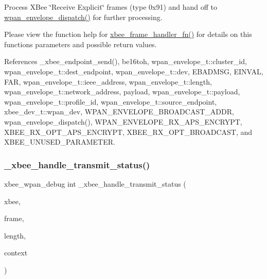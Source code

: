 Process X\+Bee \char`\"{}\+Receive Explicit\char`\"{} frames (type 0x91) and hand off to \hyperlink{group__wpan__aps_gae84eafd10f51de6cdac4732b8948606d}{wpan\+\_\+envelope\+\_\+dispatch()} for further processing. 

Please view the function help for \hyperlink{group__xbee__device_ga3e6f2b540e8cec7a69ef0b0166da14ff}{xbee\+\_\+frame\+\_\+handler\+\_\+fn()} for details on this function\textquotesingle{}s parameters and possible return values. 

References \+\_\+xbee\+\_\+endpoint\+\_\+send(), be16toh, wpan\+\_\+envelope\+\_\+t\+::cluster\+\_\+id, wpan\+\_\+envelope\+\_\+t\+::dest\+\_\+endpoint, wpan\+\_\+envelope\+\_\+t\+::dev, E\+B\+A\+D\+M\+SG, E\+I\+N\+V\+AL, F\+AR, wpan\+\_\+envelope\+\_\+t\+::ieee\+\_\+address, wpan\+\_\+envelope\+\_\+t\+::length, wpan\+\_\+envelope\+\_\+t\+::network\+\_\+address, payload, wpan\+\_\+envelope\+\_\+t\+::payload, wpan\+\_\+envelope\+\_\+t\+::profile\+\_\+id, wpan\+\_\+envelope\+\_\+t\+::source\+\_\+endpoint, xbee\+\_\+dev\+\_\+t\+::wpan\+\_\+dev, W\+P\+A\+N\+\_\+\+E\+N\+V\+E\+L\+O\+P\+E\+\_\+\+B\+R\+O\+A\+D\+C\+A\+S\+T\+\_\+\+A\+D\+DR, wpan\+\_\+envelope\+\_\+dispatch(), W\+P\+A\+N\+\_\+\+E\+N\+V\+E\+L\+O\+P\+E\+\_\+\+R\+X\+\_\+\+A\+P\+S\+\_\+\+E\+N\+C\+R\+Y\+PT, X\+B\+E\+E\+\_\+\+R\+X\+\_\+\+O\+P\+T\+\_\+\+A\+P\+S\+\_\+\+E\+N\+C\+R\+Y\+PT, X\+B\+E\+E\+\_\+\+R\+X\+\_\+\+O\+P\+T\+\_\+\+B\+R\+O\+A\+D\+C\+A\+ST, and X\+B\+E\+E\+\_\+\+U\+N\+U\+S\+E\+D\+\_\+\+P\+A\+R\+A\+M\+E\+T\+ER.

\mbox{\label{group__xbee__wpan_ga56d68291ceee384fbd8a5833eb91182c}} 
\subsubsection{\texorpdfstring{\+\_\+xbee\+\_\+handle\+\_\+transmit\+\_\+status()}{\_xbee\_handle\_transmit\_status()}}
{\footnotesize\ttfamily xbee\+\_\+wpan\+\_\+debug int \+\_\+xbee\+\_\+handle\+\_\+transmit\+\_\+status (\begin{DoxyParamCaption}\item[{\hyperlink{structxbee__dev__t}{xbee\+\_\+dev\+\_\+t} $\ast$}]{xbee,  }\item[{const void \hyperlink{group__hal_gaef060b3456fdcc093a7210a762d5f2ed}{F\+AR} $\ast$}]{frame,  }\item[{\hyperlink{group__hal__dos_ga5a8b2dc9e45a9ee81a94ef304fb62505}{uint16\+\_\+t}}]{length,  }\item[{void \hyperlink{group__hal_gaef060b3456fdcc093a7210a762d5f2ed}{F\+AR} $\ast$}]{context }\end{DoxyParamCaption})}

